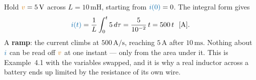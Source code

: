 \documentclass[11pt,a4paper]{article}
\newcommand{\Icol}[1]{\textcolor{ccur}{#1}}
\newcommand{\Vcol}[1]{\textcolor{cvolt}{#1}}
\newcommand{\uni}[1]{\,\mathrm{#1}}
\newcommand{\A}{\uni{A}}   \newcommand{\V}{\uni{V}}
\begin{document}

\begin{examplebox}
Hold $\Vcol{v} = 5\V$ across $L = 10\uni{mH}$, starting from $\Icol{i(0)} = 0$. The
integral form gives
\[
  \Icol{i(t)} = \frac{1}{L}\int_0^t 5\,d\tau = \frac{5}{10^{-2}}\,t = 500\,t \ \ [\mathrm{A}] .
\]
A \textbf{ramp}: the current climbs at $500\uni{A/s}$, reaching $5\A$ after $10\uni{ms}$.
Nothing about $\Icol{i}$ can be read off $\Vcol{v}$ at one instant --- only from the area
under it. This is Example~4.1 with the variables swapped, and it is why a real inductor
across a battery ends up limited by the resistance of its own wire.
\end{examplebox}
\end{document}
